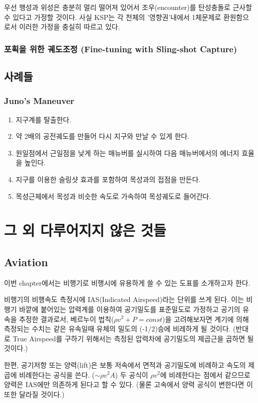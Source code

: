 \documentclass[9pt]{amsbook}
\begin{document}
우선 행성과 위성은 충분히 멀리 떨어져 있어서 조우(encounter)를 탄성충돌로 근사할 수 있다고 가정할 것이다. 사실 KSP는 각 천체의 '영향권'내에서 1체문제로 환원함으로서 이러한 가정을 충실히 따르고 있다.
\section{포획을 위한 궤도조정 (Fine-tuning with Sling-shot Capture)}

\chapter{사례들}
\section{Juno's Maneuver}
\begin{enumerate}
\item 지구계를 탈출한다.
\item 약 2배의 공전궤도를 만들어 다시 지구와 만날 수 있게 한다.
\item 원일점에서 근일점을 낮게 하는 매뉴버를 실시하여 다음 매뉴버에서의 에너지 효율을 높인다.
\item 지구를 이용한 슬링샷 효과를 포함하여 목성과의 접점을 만든다.
\item 목성근체에서 목성과 비슷한 속도로 가속하여 목성궤도로 들어간다.
\end{enumerate}
\part{그 외 다루어지지 않은 것들}
\chapter{Aviation}
이번 chapter에서는 비행기로 비행시에 유용하게 쓸 수 있는 도표를 소개하고자 한다.

비행기의 비행속도 측정시에 IAS(Indicated Airspeed)라는 단위를 쓰게 된다. 
이는 비행기 바깥에 붙어있는 압력계를 이용하여 공기밀도를 표준밀도로 가정하고 공기의 유속을 추정한 결과로서, 베르누이 법칙($\rho v^2 + P = const$)을 고려해보자면 계기에 의해 측정되는 수치는 같은 유속일때 유체의 밀도의 (-1/2)승에 비레하게 될 것이다. (반대로 True Airspeed를 구하기 위해서는 측정된 압력차에 공기밀도의 제곱근을 곱하면 될 것이다.)

한편, 공기저항 또는 양력(lift)은 보통 저속에서 면적과 공기밀도에 비례하고 속도의 제곱에 비례한다는 공식을 쓴다. ($\sim \rho v^2 A$)
두 공식이 $\rho v^2$에 비례한다는 점에서 같으므로 양력은 IAS에만 의존하게 된다고 할 수 있다. (물론 고속에서 양력 공식이 변한다면 이 또한 달라질 것이다.)
\end{document}
